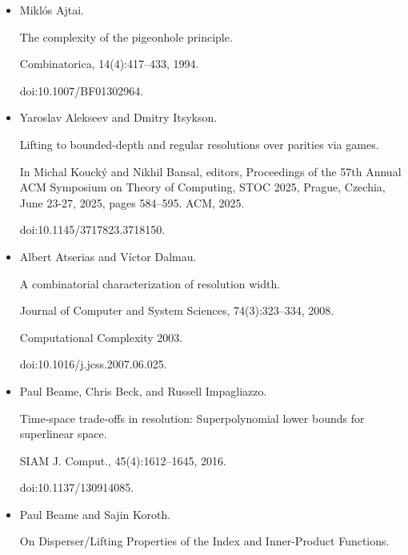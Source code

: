 \begin{itemize}


\item 
[1]

Miklós Ajtai.


The complexity of the pigeonhole principle.


Combinatorica, 14(4):417–433, 1994.


doi:10.1007/BF01302964.





\item 
[2]

Yaroslav Alekseev and Dmitry Itsykson.


Lifting to bounded-depth and regular resolutions over parities via
games.


In Michal Koucký and Nikhil Bansal, editors, Proceedings
of the 57th Annual ACM Symposium on Theory of Computing, STOC 2025,
Prague, Czechia, June 23-27, 2025, pages 584–595. ACM, 2025.


doi:10.1145/3717823.3718150.





\item 
[3]

Albert Atserias and Víctor Dalmau.


A combinatorial characterization of resolution width.


Journal of Computer and System Sciences, 74(3):323–334, 2008.


Computational Complexity 2003.


doi:10.1016/j.jcss.2007.06.025.





\item 
[4]

Paul Beame, Chris Beck, and Russell Impagliazzo.


Time-space trade-offs in resolution: Superpolynomial lower bounds for
superlinear space.


SIAM J. Comput., 45(4):1612–1645, 2016.


doi:10.1137/130914085.





\item 
[5]

Paul Beame and Sajin Koroth.


On Disperser/Lifting Properties of the Index and Inner-Product
Functions.



\end{itemize}
